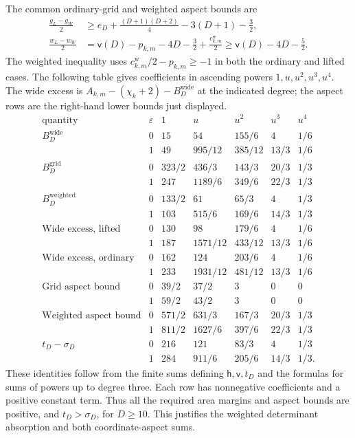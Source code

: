 \documentclass[11pt]{amsart}
\theoremstyle{definition}
\theoremstyle{remark}
\numberwithin{equation}{section}
\begin{document}
The common ordinary-grid and weighted aspect bounds are
\[
\begin{aligned}
\frac{g_L-g_W}{2}&\ge e_D+\frac{(D+1)(D+2)}4-3(D+1)-\frac32,\\
\frac{w_L-w_W}{2}&=\mathsf{v}(D)-p_{k,m}-4D-\frac32+\frac{c_{k,m}^{\mathrm w}}2\ge\mathsf{v}(D)-4D-\frac52.
\end{aligned}
\]
The weighted inequality uses $c_{k,m}^{\mathrm w}/2-p_{k,m}\ge-1$ in both the ordinary and lifted cases. The following table gives coefficients in ascending powers $1,u,u^2,u^3,u^4$. The wide excess is $A_{k,m}-(\chi_k+2)-B_D^{\mathrm{wide}}$ at the indicated degree; the aspect rows are the right-hand lower bounds just displayed.
\begingroup
\small
\setlength{\arraycolsep}{4pt}
\[
\begin{array}{l|c|ccccc}
\text{quantity}&\varepsilon&1&u&u^2&u^3&u^4\\\hline
B_D^{\mathrm{wide}}&0&15&54&155/6&4&1/6\\
&1&49&995/12&385/12&13/3&1/6\\
B_D^{\mathrm{grid}}&0&323/2&436/3&143/3&20/3&1/3\\
&1&247&1189/6&349/6&22/3&1/3\\
B_D^{\mathrm{weighted}}&0&133/2&61&65/3&4&1/3\\
&1&103&515/6&169/6&14/3&1/3\\\hline
\text{Wide excess, lifted}&0&130&98&179/6&4&1/6\\
&1&187&1571/12&433/12&13/3&1/6\\
\text{Wide excess, ordinary}&0&162&124&203/6&4&1/6\\
&1&233&1931/12&481/12&13/3&1/6\\\hline
\text{Grid aspect bound}&0&39/2&37/2&3&0&0\\
&1&59/2&43/2&3&0&0\\
\text{Weighted aspect bound}&0&571/2&631/3&167/3&20/3&1/3\\
&1&811/2&1627/6&397/6&22/3&1/3\\
t_D-\sigma_D&0&216&121&83/3&4&1/3\\
&1&284&911/6&205/6&14/3&1/3.
\end{array}
\]
\endgroup
These identities follow from the finite sums defining $\mathsf h,\mathsf v,t_D$ and the formulas for sums of powers up to degree three. Each row has nonnegative coefficients and a positive constant term. Thus all the required area margins and aspect bounds are positive, and $t_D>\sigma_D$, for $D\ge10$. This justifies the weighted determinant absorption and both coordinate-aspect sums.
\end{document}
